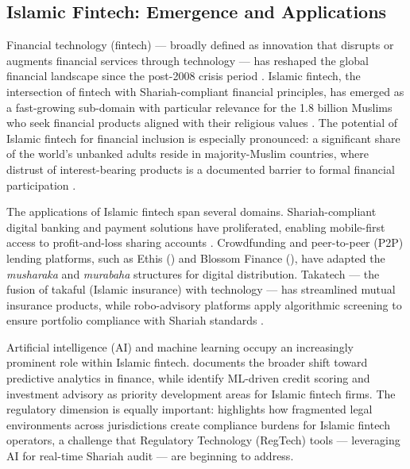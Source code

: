 \subsection{Islamic Fintech: Emergence and Applications}
\label{subsec:islamic_fintech}

Financial technology (fintech) — broadly defined as innovation that disrupts or
augments financial services through technology — has reshaped the global
financial landscape since the post-2008 crisis period
\citep{arner2016evolution, arslanian2019future}. Islamic fintech, the
intersection of fintech with Shariah-compliant financial principles, has
emerged as a fast-growing sub-domain with particular relevance for the 1.8
billion Muslims who seek financial products aligned with their religious values
\citep{demirguc2018global}. The potential of Islamic fintech for financial
inclusion is especially pronounced: a significant share of the world's
unbanked adults reside in majority-Muslim countries, where distrust of
interest-bearing products is a documented barrier to formal financial
participation \citep{demirguc2013islamic}.

The applications of Islamic fintech span several domains. Shariah-compliant
digital banking and payment solutions have proliferated, enabling mobile-first
access to profit-and-loss sharing accounts \citep{dawood2022business}.
Crowdfunding and peer-to-peer (P2P) lending platforms, such as Ethis
(\citeyear{ethis2021about}) and Blossom Finance (\citeyear{blossom2023halal}),
have adapted the \textit{musharaka} and \textit{murabaha} structures for
digital distribution. Takatech — the fusion of takaful (Islamic insurance)
with technology — has streamlined mutual insurance products, while robo-advisory
platforms apply algorithmic screening to ensure portfolio compliance with
Shariah standards \citep{cengiz2023fintech}.

Artificial intelligence (AI) and machine learning occupy an increasingly
prominent role within Islamic fintech. \citet{broby2022predictive} documents
the broader shift toward predictive analytics in finance, while
\citet{dawood2022business} identify ML-driven credit scoring and investment
advisory as priority development areas for Islamic fintech firms. The
regulatory dimension is equally important: \citet{ahmad2013regulatory}
highlights how fragmented legal environments across jurisdictions create
compliance burdens for Islamic fintech operators, a challenge that
Regulatory Technology (RegTech) tools — leveraging AI for real-time Shariah
audit — are beginning to address.

